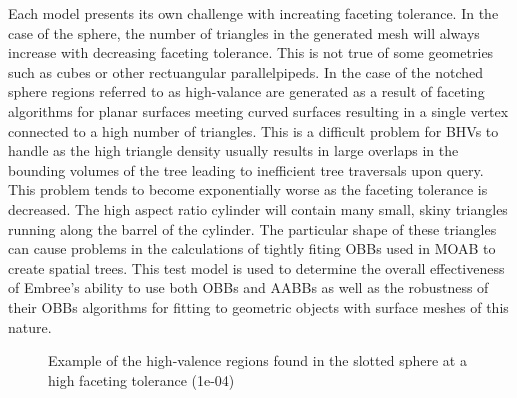 \documentclass{anstrans}
\begin{document}
Each model presents its own challenge with increating faceting tolerance. In the case of the sphere, the number of triangles in the generated mesh will always increase with decreasing faceting tolerance. This is not true of some geometries such as cubes or other rectuangular parallelpipeds. In the case of the notched sphere regions referred to as high-valance are generated as a result of faceting algorithms for planar surfaces meeting curved surfaces resulting in a single vertex connected to a high number of triangles. This is a difficult problem for BHVs to handle as the high triangle density usually results in large overlaps in the bounding volumes of the tree leading to inefficient tree traversals upon query. This problem tends to become exponentially worse as the faceting tolerance is decreased. The high aspect ratio cylinder will contain many small, skiny triangles running along the barrel of the cylinder. The particular shape of these triangles can cause problems in the calculations of tightly fiting OBBs used in MOAB to create spatial trees. This test model is used to determine the overall effectiveness of Embree's ability to use both OBBs and AABBs as well as the robustness of their OBBs algorithms for fitting to geometric objects with surface meshes of this nature.

\begin{figure}

  \begin{center}

    \caption{Example of the high-valence regions found in the slotted sphere at a high faceting tolerance (1e-04)}

  \end{center}

\end{figure}






\end{document}
